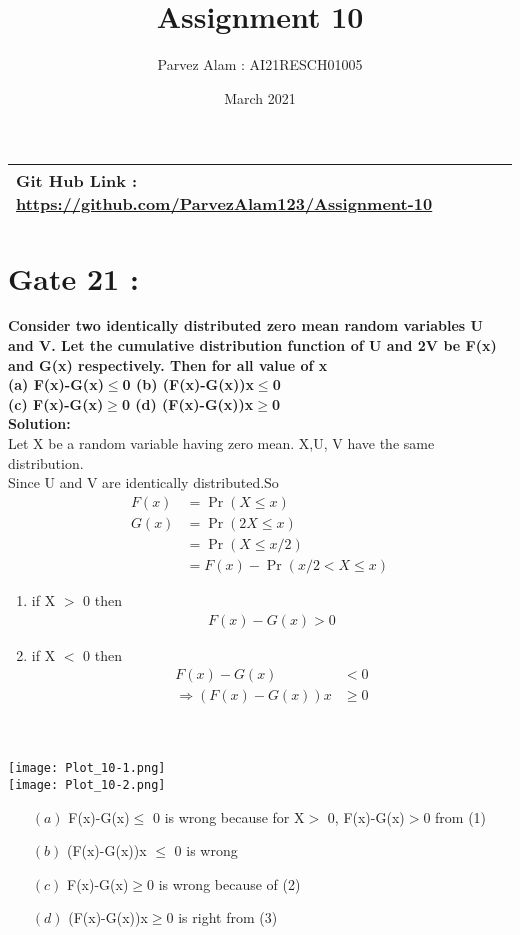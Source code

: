 \documentclass{article}
\title{Assignment 10}
\author{Parvez Alam : AI21RESCH01005 }
\date{March 2021}
\begin{document}
\maketitle
\begin{multicols}{2}
\begin{center}
    \begin{tabular}{|p{5cm}|}
    \hline
         Git Hub Link : \url{https://github.com/ParvezAlam123/Assignment-10} \\
    \hline
    \end{tabular}
\end{center}


\section{Gate 21 :}
\textbf{Consider two identically distributed zero mean random variables U and V. Let the cumulative distribution function of U and 2V be F(x) and G(x) respectively. Then for all value of x  \\
(a) F(x)-G(x)\(\leq\)0  (b) (F(x)-G(x))x\(\leq\)0 \\
(c) F(x)-G(x)\(\geq\)0  (d) (F(x)-G(x))x\(\geq\)0} \\
\textbf{Solution: } \\
Let X be a random variable having zero mean. X,U, V have the same distribution. \\
Since U and V are identically distributed.So
\begin{align}
    F(x) &= \Pr(X\leq x) \nonumber \\
    G(x) &= \Pr(2X\leq x) \nonumber \\
         &= \Pr(X \leq x/2) \nonumber \\
         &=F(x)-\Pr(x/2<X\leq x) \nonumber
\end{align}
\begin{enumerate}
    \item if X \(>\) 0 then
\begin{align}
    F(x)-G(x)>0 
\end{align}
     \item if X \(<\) 0 then
\begin{align}
    F(x)-G(x)&<0  \\
    \Rightarrow (F(x)-G(x))x& \geq 0  
\end{align}
\end{enumerate}
\\ \\
\texttt{[image: Plot\_10-1.png]} \\
\texttt{[image: Plot\_10-2.png]}
\begin{enumerate}
    \item[$(a)$] F(x)-G(x)\(\leq\) 0 is wrong because for X\( >\) 0, F(x)-G(x)\(>\)0  from (1)
    \item[$(b)$](F(x)-G(x))x \(\leq\) 0 is  wrong 
    \item[$(c)$]F(x)-G(x)\(\geq\)0 is wrong because of (2)
    \item[$(d)$](F(x)-G(x))x\(\geq\)0 is right from (3)
\end{enumerate}


\end{multicols}
\end{document}
